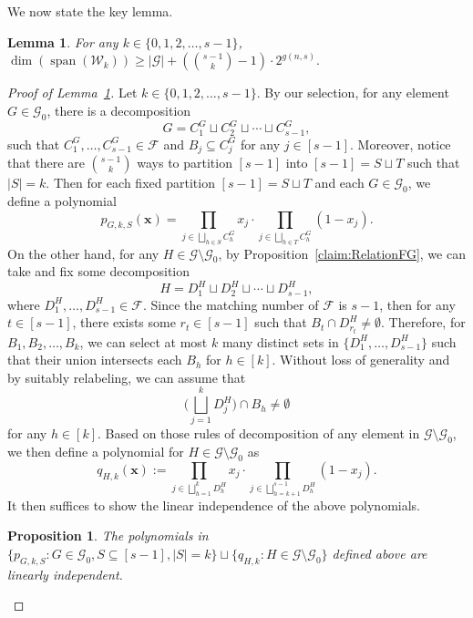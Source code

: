 \documentclass[11pt]{article}
\newtheorem{prop}[theorem]{Proposition}
\newtheorem{lemma}[theorem]{Lemma}
\theoremstyle{definition}
\begin{document}
We now state the key lemma.
\begin{lemma}\label{prop:Final}
    For any \(k\in\{0,1,2,\ldots,s-1\}\), \(\dim(\operatorname{span}(\mathcal{W}_{k}))\ge |\mathcal{G}|+\left(\binom{s-1}{k}-1\right)\cdot 2^{g(n,s)}.\)
\end{lemma}
\begin{proof}[Proof of Lemma~\ref{prop:Final}]
    Let \(k\in\{0,1,2,\ldots,s-1\}\). By our selection, for any element \(G\in \mathcal{G}_{0}\), there is a decomposition 
\[
G=C_{1}^{G}\sqcup C_{2}^{G}\sqcup\cdots\sqcup C_{s-1}^{G},
\]
such that \(C_{1}^{G},\ldots,C_{s-1}^{G}\in\mathcal{F}\) and \(B_{j}\subseteq C_{j}^{G}\) for any \(j\in [s-1].\) Moreover, notice that there are \(\binom{s-1}{k}\) ways to partition \([s-1]\) into \([s-1]=S\sqcup T\) such that \(|S|=k\). Then for each fixed partition \([s-1]=S\sqcup T\) and each \(G\in\mathcal{G}_{0}\), we define a polynomial
\[
p_{G,k,S}(\bm{x})=\prod\limits_{j\in \bigsqcup_{h\in S}C_{h}^{G}}x_{j}\cdot \prod\limits_{j\in \bigsqcup_{h\in T}C_{h}^{G}}(1-x_{j}).
\]
On the other hand, for any \(H\in\mathcal{G}\setminus\mathcal{G}_{0}\), by Proposition~\ref{claim:RelationFG}, we can take and fix some decomposition
\[
H=D_{1}^{H}\sqcup D_{2}^{H}\sqcup\cdots\sqcup D_{s-1}^{H},
\]
where \(D_{1}^{H},\ldots,D_{s-1}^{H}\in\mathcal{F}.\) Since the matching number of \(\mathcal{F}\) is \(s-1\), then for any \(t\in [s-1]\), there exists some \(r_{t}\in [s-1]\) such that \(B_{t}\cap D_{r_{t}}^{H}\neq\emptyset.\) Therefore, for \(B_{1},B_{2},\ldots,B_{k}\), we can select at most \(k\) many distinct sets in \(\{D_{1}^{H},\ldots,D_{s-1}^{H}\}\) such that their union intersects each \(B_{h}\) for \(h\in [k]\). Without loss of generality and by suitably relabeling, we can assume that
\begin{equation}\label{RelationBDBD}
    \bigg(\bigsqcup_{j=1}^{k}D_{j}^{H}\bigg)\cap B_{h}\neq\emptyset
\end{equation}
for any \(h\in [k].\) Based on those rules of decomposition of any element in \(\mathcal{G}\setminus\mathcal{G}_{0}\), we then define a polynomial for \(H\in\mathcal{G}\setminus\mathcal{G}_{0}\) as
\[
q_{H,k}(\bm{x}):=\prod\limits_{j\in\bigsqcup_{h=1}^{k}D_{h}^{H}}x_{j}\cdot \prod\limits_{j\in\bigsqcup_{h=k+1}^{s-1}D_{h}^{H}}(1-x_{j}).
\]
It then suffices to show the linear independence of the above polynomials.
\begin{prop}\label{claim:FinalLinearInd}
   The polynomials in \(\{p_{G,k,S}:G\in \mathcal{G}_{0},S\subseteq [s-1],|S|=k\}\sqcup \{q_{H,k}: H\in \mathcal{G}\setminus\mathcal{G}_{0}\}\) defined above are linearly independent. 

\end{prop}
\end{proof}
\end{document}
